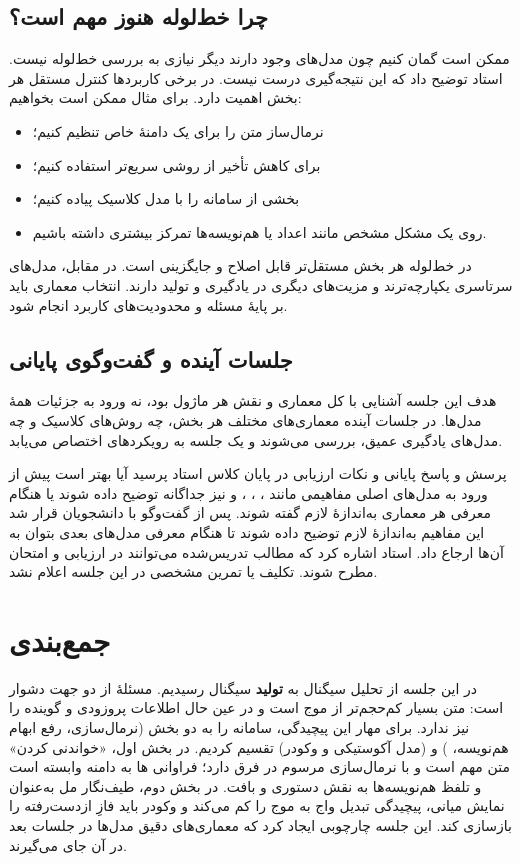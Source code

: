 \subsection{چرا خط‌لوله هنوز مهم است؟}
ممکن است گمان کنیم چون مدل‌های  وجود دارند دیگر نیازی به بررسی خط‌لوله نیست. استاد توضیح داد که این نتیجه‌گیری درست نیست. در برخی کاربردها کنترل مستقل هر بخش اهمیت دارد. برای مثال ممکن است بخواهیم:
\begin{itemize}
  \item نرمال‌ساز متن را برای یک دامنهٔ خاص تنظیم کنیم؛
  \item برای کاهش تأخیر از روشی سریع‌تر استفاده کنیم؛
  \item بخشی از سامانه را با مدل کلاسیک پیاده کنیم؛
  \item روی یک مشکل مشخص مانند اعداد یا هم‌نویسه‌ها تمرکز بیشتری داشته باشیم.
\end{itemize}
در خط‌لوله هر بخش مستقل‌تر قابل اصلاح و جایگزینی است. در مقابل، مدل‌های سرتاسری یکپارچه‌ترند و مزیت‌های دیگری در یادگیری و تولید دارند. انتخاب معماری باید بر پایهٔ مسئله و محدودیت‌های کاربرد انجام شود.

\subsection{جلسات آینده و گفت‌وگوی پایانی}
هدف این جلسه آشنایی با کل معماری  و نقش هر ماژول بود، نه ورود به جزئیات همهٔ مدل‌ها. در جلسات آینده معماری‌های مختلف هر بخش، چه روش‌های کلاسیک و چه مدل‌های یادگیری عمیق، بررسی می‌شوند و یک جلسه به رویکردهای  اختصاص می‌یابد.

\begin{exambox}{پرسش و پاسخ پایانی و نکات ارزیابی}
در پایان کلاس استاد پرسید آیا بهتر است پیش از ورود به مدل‌های اصلی مفاهیمی مانند ، ، ،  و  نیز جداگانه توضیح داده شوند یا هنگام معرفی هر معماری به‌اندازهٔ لازم گفته شوند. پس از گفت‌وگو با دانشجویان قرار شد این مفاهیم به‌اندازهٔ لازم توضیح داده شوند تا هنگام معرفی مدل‌های بعدی بتوان به آن‌ها ارجاع داد. استاد اشاره کرد که مطالب تدریس‌شده می‌توانند در ارزیابی و امتحان مطرح شوند. تکلیف یا تمرین مشخصی در این جلسه اعلام نشد.
\end{exambox}

\section{جمع‌بندی}
در این جلسه از تحلیل سیگنال به \textbf{تولید} سیگنال رسیدیم. مسئلهٔ  از دو جهت دشوار است: متن بسیار کم‌حجم‌تر از موج است و در عین حال اطلاعات پروزودی و گوینده را نیز ندارد. برای مهار این پیچیدگی، سامانه را به دو بخش  (نرمال‌سازی، رفع ابهام هم‌نویسه، ) و  (مدل آکوستیکی و وکودر) تقسیم کردیم. در بخش اول، «خواندنی کردن» متن مهم است و با نرمال‌سازی مرسوم در  فرق دارد؛ فراوانی ها به دامنه وابسته است و تلفظ هم‌نویسه‌ها به نقش دستوری و بافت. در بخش دوم، طیف‌نگار مل به‌عنوان نمایش میانی، پیچیدگی تبدیل واج به موج را کم می‌کند و وکودر باید فازِ ازدست‌رفته را بازسازی کند. این جلسه چارچوبی ایجاد کرد که معماری‌های دقیق مدل‌ها در جلسات بعد در آن جای می‌گیرند.

